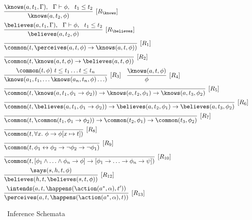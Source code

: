 \begin{figure}[h]
\begin{mdframed}[nobreak=true, roundcorner=8pt, frametitlealignment=\centering]
\begin{equation*}
\begin{aligned}
  &\infer[{[R_{\knows}]}]{\knows(a,t_2,\phi)}{\knows(a,t_1,\Gamma), \ 
    \ \Gamma\vdash\phi, \ \ t_1 \leq t_2} \\ 
& \infer[{[R_{\believes}]}]{\believes(a,t_2,\phi)}{\believes(a,t_1,\Gamma), \ 
    \ \Gamma\vdash\phi, \ \ t_1 \leq t_2} \\
& \infer[{[R_1]}]{\common(t,\perceives(a,t,\phi) \lif\knows(a,t,\phi))}{}\\
&  \infer[{[R_2]}]{\common(t,\knows(a,t,\phi)
    \lif\believes(a,t,\phi))}{}\\
  &\infer[{[R_3]}]{\knows(a_1, t_1, \ldots
    \knows(a_n,t_n,\phi)\ldots)}{\common(t,\phi) \ t\leq t_1 \ldots t\leq
    t_n}\hspace{10pt}
  \infer[{[R_4]}]{\phi}{\knows(a,t,\phi)}\\
  & \infer[{[R_5]}]{\common(t,\knows(a,t_1,\phi_1\lif\phi_2))
    \lif \knows(a,t_2,\phi_1) \lif \knows(a,t_3,\phi_2)}{}\\
& \infer[{[R_6]}]{\common(t,\believes(a,t_1,\phi_1\lif\phi_2))
    \lif \believes(a,t_2,\phi_1) \lif \believes(a,t_3,\phi_2)}{}\\
& \infer[{[R_7]}]{\common(t,\common(t_1,\phi_1\lif\phi_2))
    \lif \common(t_2,\phi_1) \lif \common(t_3,\phi_2)}{} \\
& \infer[{[R_8]}]{\common(t, \forall x. \  \phi \lif \phi[x\mapsto
  t])}{} \\
& \infer[{[R_9]}]{\common(t,\phi_1 \liff \phi_2 \lif \neg
    \phi_2 \lif \neg \phi_1)}{}\\
& \infer[{[R_{10}]}] {\common(t,[\phi_1\land\ldots\land\phi_n\lif\phi]
  \lif [\phi_1\lif\ldots\lif\phi_n\lif\psi])}{}\\
& \infer[{[R_{12}]}]{\believes(h,t,\believes(s,t,\phi))}{\says(s,h,t,\phi)} \\
& \infer[{[R_{13}]}]{\perceives(a,t,\happens(\action(a^\ast,\alpha),t))}{\intends(a,t,\happens(\action(a^\ast,\alpha),t'))}
\end{aligned}
\end{equation*}
\end{mdframed}
\caption{\CEC\ Inference Schemata}
\label{fig:cec_schemata}
\end{figure}

